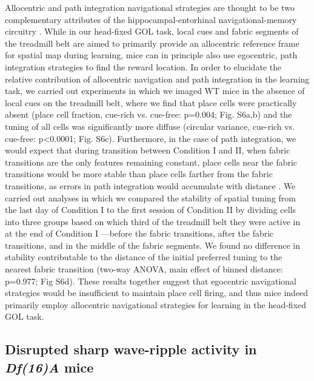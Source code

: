Allocentric and path integration navigational strategies are thought to be two complementary attributes of the hippocampal-entorhinal navigational-memory circuitry \citep{Buzsaki2013}\citep{Etienne2004}\citep{Gothard1996}\citep{Moser2015}. While in our head-fixed GOL task, local cues and fabric segments of the treadmill belt are aimed to primarily provide an allocentric reference frame for spatial map during learning, mice can in principle also use egocentric, path integration strategies to find the reward location. In order to elucidate the relative contribution of allocentric navigation and path integration in the learning task, we carried out experiments in which we imaged WT mice in the absence of local cues on the treadmill belt, where we find that place cells were practically absent (place cell fraction, cue-rich vs. cue-free: p=0.004; Fig. S6a,b) and the tuning of all cells was significantly more diffuse (circular variance, cue-rich vs. cue-free: p<0.0001; Fig. S6c). Furthermore, in the case of path integration, we would expect that during transition between Condition I and II, when fabric transitions are the only features remaining constant, place cells near the fabric transitions would be more stable than place cells farther from the fabric transitions, as errors in path integration would accumulate with distance \citep{Etienne2004}\citep{Gothard1996}. We carried out analyses in which we compared the stability of spatial tuning from the last day of Condition I to the first session of Condition II by dividing cells into three groups based on which third of the treadmill belt they were active in at the end of Condition I —before the fabric transitions, after the fabric transitions, and in the middle of the fabric segments. We found no difference in stability contributable to the distance of the initial preferred tuning to the nearest fabric transition (two-way ANOVA, main effect of binned distance: p=0.977; Fig S6d). These results together suggest that egocentric navigational strategies would be insufficient to maintain place cell firing, and thus mice indeed primarily employ allocentric navigational strategies for learning in the head-fixed GOL task.

\subsection{Disrupted sharp wave-ripple activity in \emph{Df(16)A\super{+/-}} mice}

